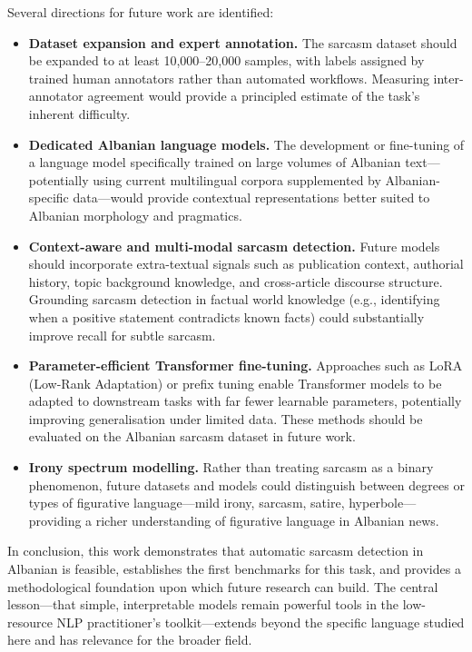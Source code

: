 \documentclass[12pt,a4paper]{article}
\begin{document}
Several directions for future work are identified:

\begin{itemize}[itemsep=0.3em]
    \item \textbf{Dataset expansion and expert annotation.} The sarcasm dataset should be expanded to at least 10,000--20,000 samples, with labels assigned by trained human annotators rather than automated workflows. Measuring inter-annotator agreement would provide a principled estimate of the task's inherent difficulty.

    \item \textbf{Dedicated Albanian language models.} The development or fine-tuning of a language model specifically trained on large volumes of Albanian text---potentially using current multilingual corpora supplemented by Albanian-specific data---would provide contextual representations better suited to Albanian morphology and pragmatics.

    \item \textbf{Context-aware and multi-modal sarcasm detection.} Future models should incorporate extra-textual signals such as publication context, authorial history, topic background knowledge, and cross-article discourse structure. Grounding sarcasm detection in factual world knowledge (e.g., identifying when a positive statement contradicts known facts) could substantially improve recall for subtle sarcasm.

    \item \textbf{Parameter-efficient Transformer fine-tuning.} Approaches such as LoRA (Low-Rank Adaptation) or prefix tuning enable Transformer models to be adapted to downstream tasks with far fewer learnable parameters, potentially improving generalisation under limited data. These methods should be evaluated on the Albanian sarcasm dataset in future work.

    \item \textbf{Irony spectrum modelling.} Rather than treating sarcasm as a binary phenomenon, future datasets and models could distinguish between degrees or types of figurative language---mild irony, sarcasm, satire, hyperbole---providing a richer understanding of figurative language in Albanian news.
\end{itemize}

In conclusion, this work demonstrates that automatic sarcasm detection in Albanian is feasible, establishes the first benchmarks for this task, and provides a methodological foundation upon which future research can build. The central lesson---that simple, interpretable models remain powerful tools in the low-resource NLP practitioner's toolkit---extends beyond the specific language studied here and has relevance for the broader field.

\newpage

\end{document}
